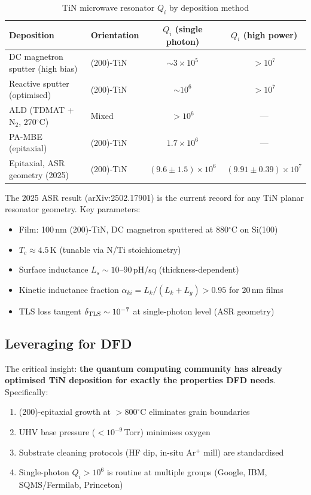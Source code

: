 \documentclass[11pt]{article}
\theoremstyle{remark}
\newcommand{\ee}[1]{\times 10^{#1}}
\begin{document}
\begin{table}[H]
\centering
\caption{TiN microwave resonator $Q_i$ by deposition method}
\begin{tabular}{@{}llcc@{}}
\toprule
Deposition & Orientation & $Q_i$ (single photon) & $Q_i$ (high power) \\
\midrule
DC magnetron sputter (high bias) & (200)-TiN & $\sim 3\ee{5}$ & $> 10^7$ \\
Reactive sputter (optimised) & (200)-TiN & $\sim 10^6$ & $> 10^7$ \\
ALD (TDMAT + N$_2$, 270$^\circ$C) & Mixed & $> 10^6$ & --- \\
PA-MBE (epitaxial) & (200)-TiN & $1.7\ee{6}$ & --- \\
Epitaxial, ASR geometry (2025) & (200)-TiN & $(9.6 \pm 1.5)\ee{6}$ & $(9.91 \pm 0.39)\ee{7}$ \\
\bottomrule
\end{tabular}
\end{table}

The 2025 ASR result (arXiv:2502.17901) is the current record for any
TiN planar resonator geometry. Key parameters:
\begin{itemize}[nosep]
  \item Film: 100\,nm (200)-TiN, DC magnetron sputtered at 880$^\circ$C
    on Si(100)
  \item $T_c \approx 4.5$\,K (tunable via N/Ti stoichiometry)
  \item Surface inductance $L_s \sim 10$--90\,pH/sq (thickness-dependent)
  \item Kinetic inductance fraction $\alpha_{ki} = L_k/(L_k + L_g) > 0.95$
    for 20\,nm films
  \item TLS loss tangent $\delta_{\rm TLS} \sim 10^{-7}$ at single-photon
    level (ASR geometry)
\end{itemize}

\subsection{Leveraging for DFD}

The critical insight: \textbf{the quantum computing community has already
optimised TiN deposition for exactly the properties DFD needs}.
Specifically:
\begin{enumerate}[nosep]
  \item (200)-epitaxial growth at $> 800^\circ$C eliminates grain boundaries
  \item UHV base pressure ($< 10^{-9}$\,Torr) minimises oxygen
  \item Substrate cleaning protocols (HF dip, in-situ Ar$^+$ mill) are
    standardised
  \item Single-photon $Q_i > 10^6$ is routine at multiple groups
    (Google, IBM, SQMS/Fermilab, Princeton)
\end{enumerate}
\end{document}
